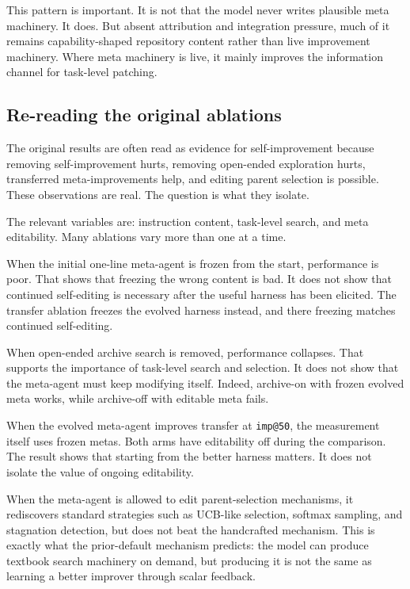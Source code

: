 \documentclass[11pt]{article}
\begin{document}
This pattern is important. It is not that the model never writes plausible meta machinery. It does. But absent attribution and integration pressure, much of it remains capability-shaped repository content rather than live improvement machinery. Where meta machinery is live, it mainly improves the information channel for task-level patching.

\subsection{Re-reading the original ablations}\label{re-reading-the-original-ablations}

The original results are often read as evidence for self-improvement because removing self-improvement hurts, removing open-ended exploration hurts, transferred meta-improvements help, and editing parent selection is possible. These observations are real. The question is what they isolate.

The relevant variables are: instruction content, task-level search, and meta editability. Many ablations vary more than one at a time.

When the initial one-line meta-agent is frozen from the start, performance is poor. That shows that freezing the wrong content is bad. It does not show that continued self-editing is necessary after the useful harness has been elicited. The transfer ablation freezes the evolved harness instead, and there freezing matches continued self-editing.

When open-ended archive search is removed, performance collapses. That supports the importance of task-level search and selection. It does not show that the meta-agent must keep modifying itself. Indeed, archive-on with frozen evolved meta works, while archive-off with editable meta fails.

When the evolved meta-agent improves transfer at \texttt{imp@50}, the measurement itself uses frozen metas. Both arms have editability off during the comparison. The result shows that starting from the better harness matters. It does not isolate the value of ongoing editability.

When the meta-agent is allowed to edit parent-selection mechanisms, it rediscovers standard strategies such as UCB-like selection, softmax sampling, and stagnation detection, but does not beat the handcrafted mechanism. This is exactly what the prior-default mechanism predicts: the model can produce textbook search machinery on demand, but producing it is not the same as learning a better improver through scalar feedback.
\end{document}

